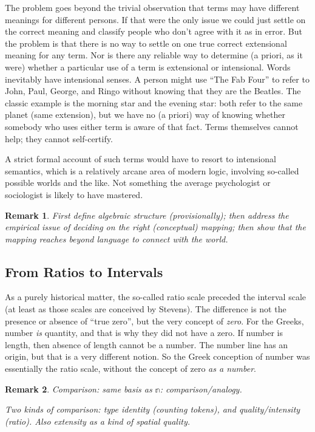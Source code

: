 \documentclass[11pt,twoside]{article}
\newtheorem{remark}{Remark}
\begin{document}
The problem goes beyond the trivial observation that terms may have
different meanings for different persons.  If that were the only issue
we could just settle on the correct meaning and classify people who
don't agree with it as in error.  But the problem is that there is no
way to settle on one true correct extensional meaning for any term.
Nor is there any reliable way to determine (a priori, as it were)
whether a particular use of a term is extensional or intensional.
Words inevitably have intensional senses.  A person might use ``The
Fab Four'' to refer to John, Paul, George, and Ringo without knowing
that they are the Beatles.  The classic example is the morning star
and the evening star: both refer to the same planet (same extension),
but we have no (a priori) way of knowing whether somebody who uses
either term is aware of that fact.  Terms themselves cannot help; they
cannot self-certify.

A strict formal account of such terms would have to resort to
intensional semantics, which is a relatively arcane area of modern
logic, involving so-called possible worlds and the like.  Not
something the average psychologist or sociologist is likely to have
mastered.

\begin{remark}
  First define algebraic structure (provisionally); then address the
  empirical issue of deciding on the right (conceptual) mapping; then
  show that the mapping reaches beyond language to connect with the
  world.
\end{remark}

\subsection{From Ratios to Intervals}

As a purely historical matter, the so-called ratio scale preceded the
interval scale (at least as those scales are conceived by Stevens).
The difference is not the presence or absence of ``true zero'', but
the very concept of \textit{zero}.  For the Greeks, number \textit{is}
quantity, and that is why they did not have a zero.  If number is
length, then absence of length cannot be a number.  The number line
has an origin, but that is a very different notion.  So the Greek
conception of number was essentially the ratio scale, without the
concept of zero \textit{as a number}.

\begin{remark}
  Comparison: same basis as \(\mathbb{n}\): comparison/analogy.

Two kinds of comparison: type identity (counting tokens), and
quality/intensity (ratio).  Also extensity as a kind of spatial
quality.

\end{remark}
\end{document}

